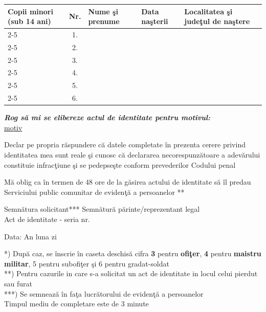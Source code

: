 \documentclass[10pt,a4paper]{article}
\newcommand{\fillline}[1][6cm]{\underline{\hspace{#1}}}
\newcommand{\fillbox}[1][0.4cm]{\framebox[#1]{\rule{0pt}{#1}}}
\begin{document}
\begin{tabularx}{\textwidth}{|m{2.4cm}|c|X|X|X|}
\hline
\multirow{7}{2.4cm}{Copii minori (sub 14 ani)} & Nr. & Nume şi prenume & Data naşterii & Localitatea şi judeţul de naştere \\
\cline{2-5}
 & 1. & & & \\
\cline{2-5}
 & 2. & & & \\
\cline{2-5}
 & 3. & & & \\
\cline{2-5}
 & 4. & & & \\
\cline{2-5}
 & 5. & & & \\
\cline{2-5}
 & 6. & & & \\
\hline
\end{tabularx}

\vspace{0.3cm}

\textit{\textbf{Rog să mi se elibereze actul de identitate pentru motivul:}}\\
\underline{ {{motiv}} }

\vspace{0.3cm}

Declar pe propria răspundere că datele completate în prezenta cerere privind identitatea mea sunt reale şi cunosc că declararea necorespunzătoare a adevărului constituie infracţiune şi se pedepseşte conform prevederilor Codului penal

\vspace{0.3cm}

Mă oblig ca în termen de 48 ore de la găsirea actului de identitate să îl predau Serviciului public comunitar de evidenţă a persoanelor **

\vspace{0.3cm}

Semnătura solicitant*** \fillline[4cm] \hfill Semnătură părinte/reprezentant legal \fillline[4cm]\\
\hspace*{8cm}\hfill Act de identitate - seria \fillline[1.5cm] nr. \fillline[3cm]

\vspace{0.3cm}

Data: \hspace{0.5cm} An \fillbox\fillbox\fillbox\fillbox \hspace{0.5cm} luna \fillbox\fillbox \hspace{0.5cm} zi \fillbox\fillbox

\vspace{0.3cm}
\hrulefill

\footnotesize
*) După caz, se înscrie în caseta deschisă cifra \textbf{3} pentru \textbf{ofiţer}, \textbf{4} pentru \textbf{maistru militar}, 5 pentru subofiţer şi 6 pentru gradat-soldat\\
**) Pentru cazurile in care s-a solicitat un act de identitate in locul celui pierdut sau furat\\
***) Se semnează în faţa lucrătorului de evidenţă a persoanelor\\
Timpul mediu de completare este de 3 minute
\end{document}
